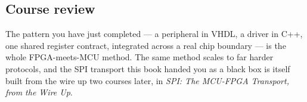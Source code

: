 \subsection*{Course review}
The pattern you have just completed --- a peripheral in VHDL, a driver in C++, one shared register
contract, integrated across a real chip boundary --- is the whole FPGA-meets-MCU method. The same
method scales to far harder protocols, and the SPI transport this book handed you as a black box is
itself built from the wire up two courses later, in \emph{SPI: The MCU-FPGA Transport, from the Wire
Up}.
